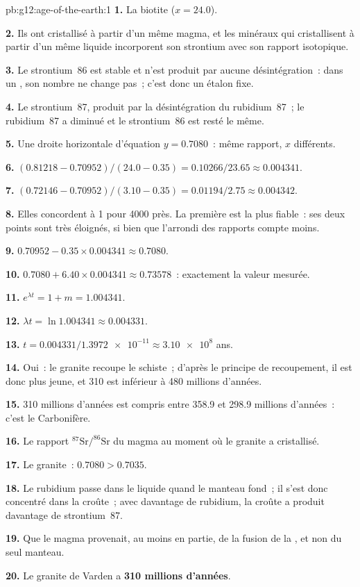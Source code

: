 \begin{solution}{pb:g12:age-of-the-earth:1}
\textbf{1.} La biotite ($x = 24.0$).

\textbf{2.} Ils ont cristallisé à partir d'un même magma, et les minéraux
qui cristallisent à partir d'un même liquide incorporent son strontium avec
son rapport isotopique.

\textbf{3.} Le strontium~86 est stable et n'est produit par aucune
désintégration~: dans un , son nombre ne change pas~; c'est
donc un étalon fixe.

\textbf{4.} Le strontium~87, produit par la désintégration du
rubidium~87~; le rubidium~87 a diminué et le strontium~86 est resté le
même.

\textbf{5.} Une droite horizontale d'équation $y = 0.7080$~: même rapport,
$x$ différents.

\textbf{6.} $(0.81218 - 0.70952)/(24.0 - 0.35) = 0.10266/23.65 \approx
0.004341$.

\textbf{7.} $(0.72146 - 0.70952)/(3.10 - 0.35) = 0.01194/2.75 \approx
0.004342$.

\textbf{8.} Elles concordent à 1 pour 4000 près. La première est la plus
fiable~: ses deux points sont très éloignés, si bien que l'arrondi des
rapports compte moins.

\textbf{9.} $0.70952 - 0.35 \times 0.004341 \approx 0.7080$.

\textbf{10.} $0.7080 + 6.40 \times 0.004341 \approx 0.73578$~: exactement
la valeur mesurée.

\textbf{11.} $e^{\lambda t} = 1 + m = 1.004341$.

\textbf{12.} $\lambda t = \ln 1.004341 \approx 0.004331$.

\textbf{13.} $t = 0.004331/\num{1.3972e-11} \approx \num{3.10e8}$ ans.

\textbf{14.} Oui~: le granite recoupe le schiste~; d'après le principe de
recoupement, il est donc plus jeune, et 310 est inférieur à 480 millions
d'années.

\textbf{15.} 310 millions d'années est compris entre 358.9 et 298.9
millions d'années~: c'est le Carbonifère.

\textbf{16.} Le rapport $^{87}\mathrm{Sr}/^{86}\mathrm{Sr}$ du magma au
moment où le granite a cristallisé.

\textbf{17.} Le granite~: $0.7080 > 0.7035$.

\textbf{18.} Le rubidium passe dans le liquide quand le manteau fond~; il
s'est donc concentré dans la croûte~; avec davantage de rubidium, la croûte
a produit davantage de strontium~87.

\textbf{19.} Que le magma provenait, au moins en partie, de la fusion de
la , et non du seul manteau.

\textbf{20.} Le granite de Varden a \textbf{310 millions d'années}.
\end{solution}
